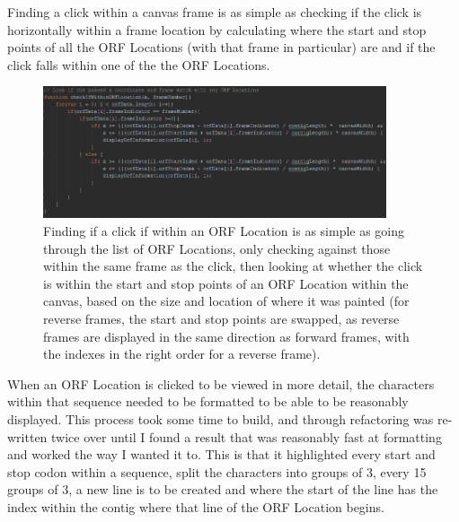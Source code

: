 Finding a click within a canvas frame is as simple as checking if the click is horizontally within a frame location by calculating where the start and stop points of all the ORF Locations (with that frame in particular) are and if the click falls within one of the the ORF Locations.

\begin{figure}[H]
\centering
\includegraphics[width=0.9\textwidth]{images/orfdisplay1}
\caption{Finding if a click if within an ORF Location is as simple as going through the list of ORF Locations, only checking against those within the same frame as the click, then looking at whether the click is within the start and stop points of an ORF Location within the canvas, based on the size and location of where it was painted (for reverse frames, the start and stop points are swapped, as reverse frames are displayed in the same direction as forward frames, with the indexes in the right order for a reverse frame).}
\end{figure}

When an ORF Location is clicked to be viewed in more detail, the characters within that sequence needed to be formatted to be able to be reasonably displayed. This process took some time to build, and through refactoring was re-written twice over until I found a result that was reasonably fast at formatting and worked the way I wanted it to. This is that it highlighted every start and stop codon within a sequence, split the characters into groups of 3, every 15 groups of 3, a new line is to be created and where the start of the line has the index within the contig where that line of the ORF Location begins.

